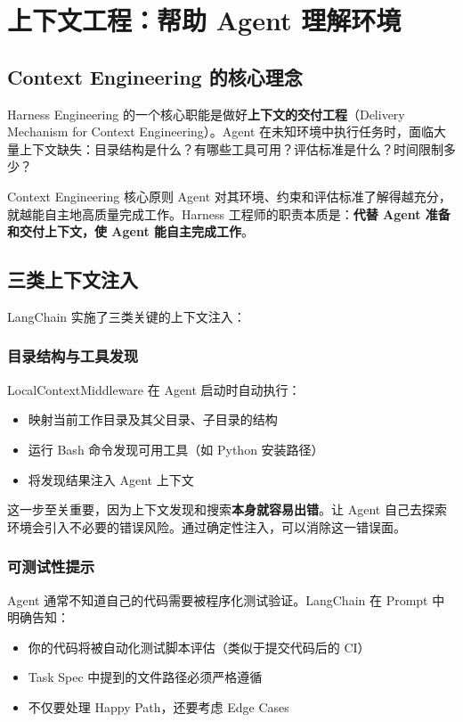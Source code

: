 \section{上下文工程：帮助 Agent 理解环境}

\subsection{Context Engineering 的核心理念}

Harness Engineering 的一个核心职能是做好\textbf{上下文的交付工程}（Delivery Mechanism for Context Engineering）。Agent 在未知环境中执行任务时，面临大量上下文缺失：目录结构是什么？有哪些工具可用？评估标准是什么？时间限制多少？

\begin{importantbox}{Context Engineering 核心原则}
Agent 对其环境、约束和评估标准了解得越充分，就越能自主地高质量完成工作。Harness 工程师的职责本质是：\textbf{代替 Agent 准备和交付上下文，使 Agent 能自主完成工作}。
\end{importantbox}

\subsection{三类上下文注入}

LangChain 实施了三类关键的上下文注入：

\subsubsection{目录结构与工具发现}

LocalContextMiddleware 在 Agent 启动时自动执行：
\begin{itemize}[leftmargin=1.5em]
    \item 映射当前工作目录及其父目录、子目录的结构
    \item 运行 Bash 命令发现可用工具（如 Python 安装路径）
    \item 将发现结果注入 Agent 上下文
\end{itemize}

这一步至关重要，因为上下文发现和搜索\textbf{本身就容易出错}。让 Agent 自己去探索环境会引入不必要的错误风险。通过确定性注入，可以消除这一错误面。

\subsubsection{可测试性提示}

Agent 通常不知道自己的代码需要被程序化测试验证。LangChain 在 Prompt 中明确告知：
\begin{itemize}[leftmargin=1.5em]
    \item 你的代码将被自动化测试脚本评估（类似于提交代码后的 CI）
    \item Task Spec 中提到的文件路径必须严格遵循
    \item 不仅要处理 Happy Path，还要考虑 Edge Cases
\end{itemize}

